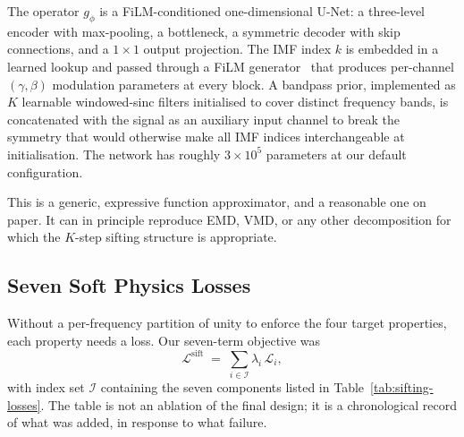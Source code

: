 \documentclass[journal]{IEEEtran}
\theoremstyle{remark}
\begin{document}
The operator $g_{\phi}$ is a FiLM-conditioned one-dimensional U-Net:
a three-level encoder with max-pooling, a bottleneck, a symmetric
decoder with skip connections, and a $1{\times}1$ output projection.
The IMF index $k$ is embedded in a learned lookup and passed through
a FiLM generator~\cite{perez2018film} that produces per-channel
$(\gamma, \beta)$ modulation parameters at every block. A bandpass
prior, implemented as $K$ learnable windowed-sinc filters initialised
to cover distinct frequency bands, is concatenated with the signal as
an auxiliary input channel to break the symmetry that would otherwise
make all IMF indices interchangeable at initialisation. The network
has roughly $3{\times}10^{5}$ parameters at our default configuration.

This is a generic, expressive function approximator, and a reasonable
one on paper. It can in principle reproduce EMD, VMD, or any other
decomposition for which the $K$-step sifting structure is appropriate.

\subsection{Seven Soft Physics Losses}
\label{subsec:sifting-loss}

Without a per-frequency partition of unity to enforce the four target
properties, each property needs a loss. Our seven-term objective was
\begin{equation}
\mathcal{L}^{\text{sift}} \;=\; \sum_{i \in \mathcal{I}}
  \lambda_{i}\,\mathcal{L}_{i} ,
\label{eq:sifting-loss}
\end{equation}
with index set $\mathcal{I}$ containing the seven components listed in
Table~\ref{tab:sifting-losses}. The table is not an ablation of the
final design; it is a chronological record of what was added, in
response to what failure.
\end{document}
